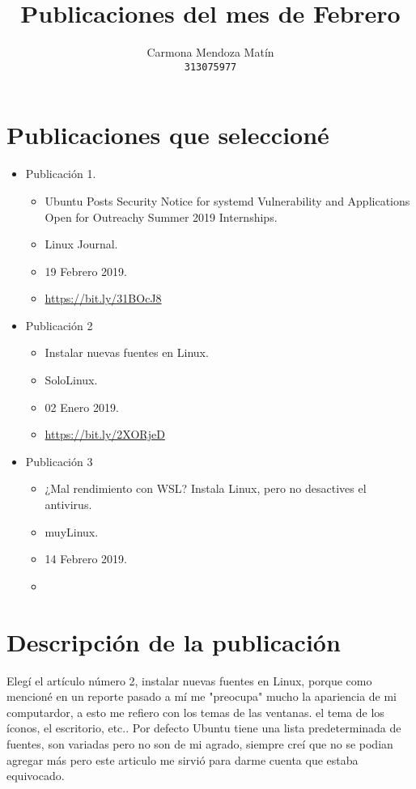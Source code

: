 \documentclass[11pt, a4paper]{report}
\begin{document}
\title{Publicaciones del mes de Febrero}
\author{
  Carmona Mendoza Mat\'in\\
  \texttt{313075977}
}
\date{}
\maketitle

\section*{Publicaciones que seleccioné}
\begin{itemize}

\item Publicación 1.
  \begin{itemize}
  \item Ubuntu Posts Security Notice for systemd Vulnerability and Applications
    Open for Outreachy Summer 2019 Internships.
  \item Linux Journal.
  \item 19 Febrero 2019.
  \item \url{https://bit.ly/31BOcJ8}
  \end{itemize}
  
\item Publicación 2
  \begin{itemize}
  \item Instalar nuevas fuentes en Linux.
  \item SoloLinux.
  \item 02 Enero 2019. 
  \item \url{https://bit.ly/2XORjeD}
  \end{itemize}

\item Publicación 3
  \begin{itemize}
  \item ¿Mal rendimiento con WSL? Instala Linux, pero no desactives el
    antivirus.
  \item muyLinux.
  \item 14 Febrero 2019.
  \item \url{}
  \end{itemize}
\end{itemize}  

\section*{Descripción de la publicación}
Elegí el artículo número 2, instalar nuevas fuentes en Linux, porque como
mencioné en un reporte pasado a mí me "preocupa" mucho la apariencia de mi
computardor, a esto me refiero con los temas de las ventanas. el tema de los
íconos, el escritorio, etc.. Por defecto Ubuntu tiene una lista predeterminada
de fuentes, son variadas pero no son de mi agrado, siempre creí que no se podian
agregar más pero este articulo me sirvió para darme cuenta que estaba
equivocado. \\
\end{document}

